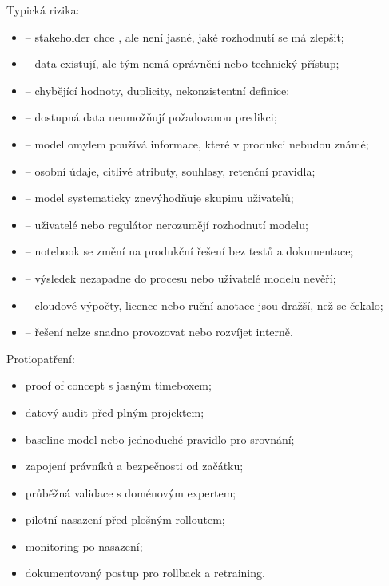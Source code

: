 Typická rizika:
\begin{itemize}
  \item {} -- stakeholder chce , ale není jasné, jaké rozhodnutí se má zlepšit;
  \item {} -- data existují, ale tým nemá oprávnění nebo technický přístup;
  \item {} -- chybějící hodnoty, duplicity, nekonzistentní definice;
  \item {} -- dostupná data neumožňují požadovanou predikci;
  \item {} -- model omylem používá informace, které v produkci nebudou známé;
  \item {} -- osobní údaje, citlivé atributy, souhlasy, retenční pravidla;
  \item {} -- model systematicky znevýhodňuje skupinu uživatelů;
  \item {} -- uživatelé nebo regulátor nerozumějí rozhodnutí modelu;
  \item {} -- notebook se změní na produkční řešení bez testů a dokumentace;
  \item {} -- výsledek nezapadne do procesu nebo uživatelé modelu nevěří;
  \item {} -- cloudové výpočty, licence nebo ruční anotace jsou dražší, než se čekalo;
  \item {} -- řešení nelze snadno provozovat nebo rozvíjet interně.
\end{itemize}

Protiopatření:
\begin{itemize}
  \item proof of concept s jasným timeboxem;
  \item datový audit před plným projektem;
  \item baseline model nebo jednoduché pravidlo pro srovnání;
  \item zapojení právníků a bezpečnosti od začátku;
  \item průběžná validace s doménovým expertem;
  \item pilotní nasazení před plošným rolloutem;
  \item monitoring po nasazení;
  \item dokumentovaný postup pro rollback a retraining.
\end{itemize}

